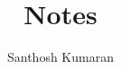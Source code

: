 \documentclass{memoir}
\title{Notes}
\author{Santhosh Kumaran}
\date{}
\begin{document}
   
\frontmatter
\maketitle
\tableofcontents*

\mainmatter

\end{document}
